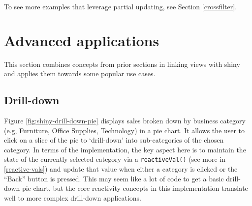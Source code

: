 \documentclass[
  12pt,
]{krantz}
\begin{document}
To see more examples that leverage partial updating, see Section \ref{crossfilter}.

\hypertarget{advanced-applications}{%
\section{Advanced applications}\label{advanced-applications}}

This section combines concepts from prior sections in linking views with shiny and applies them towards some popular use cases.

\hypertarget{drill-down}{%
\subsection{Drill-down}\label{drill-down}}

Figure \ref{fig:shiny-drill-down-pie} displays sales broken down by business category (e.g, Furniture, Office Supplies, Technology) in a pie chart. It allows the user to click on a slice of the pie to `drill-down' into sub-categories of the chosen category. In terms of the implementation, the key aspect here is to maintain the state of the currently selected category via a \texttt{reactiveVal()} (see more in \ref{reactive-vals}) and update that value when either a category is clicked or the ``Back'' button is pressed. This may seem like a lot of code to get a basic drill-down pie chart, but the core reactivity concepts in this implementation translate well to more complex drill-down applications.

\end{document}
